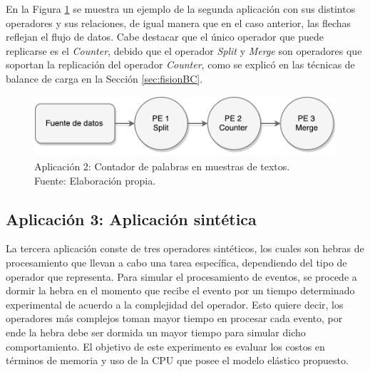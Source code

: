 En la Figura \ref{fig:segundaAplicacion} se muestra un ejemplo de la segunda aplicaci\'on con sus distintos operadores y sus relaciones, de igual manera que en el caso anterior, las flechas reflejan el flujo de datos. Cabe destacar que el \'unico operador que puede replicarse es el \textit{Counter}, debido que el operador \textit{Split} y \textit{Merge} son operadores que soportan la replicaci\'on del operador \textit{Counter}, como se explic\'o en las t\'ecnicas de balance de carga en la Secci\'on \ref{sec:fisionBC}.

\begin{figure}[!ht]
	\centering
	\captionsetup{justification=centering}
		\includegraphics[scale=0.6]{images/App2.pdf}
	\caption[Aplicaci\'on 2: Contador de palabras en muestras de textos.]{Aplicaci\'on 2: Contador de palabras en muestras de textos.\\Fuente: Elaboraci\'on propia.}
	\label{fig:segundaAplicacion}
\end{figure}

\subsection{Aplicaci\'on 3: Aplicaci\'on sint\'etica}

La tercera aplicaci\'on conste de tres operadores sint\'eticos, los cuales son hebras de procesamiento que llevan a cabo una tarea espec\'ifica, dependiendo del tipo de operador que representa. Para simular el procesamiento de eventos, se procede a dormir la hebra en el momento que recibe el evento por un tiempo determinado experimental de acuerdo a la complejidad del operador. Esto quiere decir, los operadores m\'as complejos toman mayor tiempo en procesar cada evento, por ende la hebra debe ser dormida un mayor tiempo para simular dicho comportamiento. El objetivo de este experimento es evaluar los costos en t\'erminos de memoria y uso de la CPU que posee el modelo el\'astico propuesto.

